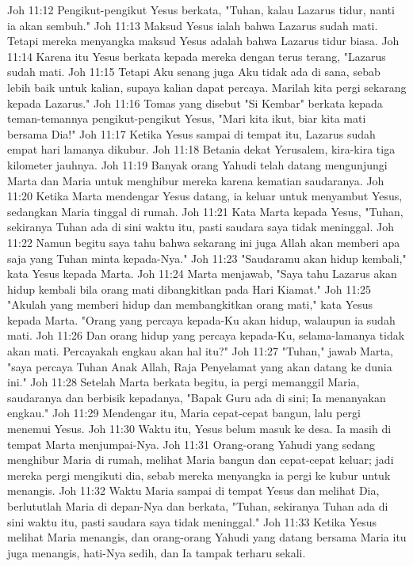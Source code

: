 Joh 11:12  Pengikut-pengikut Yesus berkata, "Tuhan, kalau Lazarus tidur, nanti ia akan sembuh."
Joh 11:13  Maksud Yesus ialah bahwa Lazarus sudah mati. Tetapi mereka menyangka maksud Yesus adalah bahwa Lazarus tidur biasa.
Joh 11:14  Karena itu Yesus berkata kepada mereka dengan terus terang, "Lazarus sudah mati.
Joh 11:15  Tetapi Aku senang juga Aku tidak ada di sana, sebab lebih baik untuk kalian, supaya kalian dapat percaya. Marilah kita pergi sekarang kepada Lazarus."
Joh 11:16  Tomas yang disebut "Si Kembar" berkata kepada teman-temannya pengikut-pengikut Yesus, "Mari kita ikut, biar kita mati bersama Dia!"
Joh 11:17  Ketika Yesus sampai di tempat itu, Lazarus sudah empat hari lamanya dikubur.
Joh 11:18  Betania dekat Yerusalem, kira-kira tiga kilometer jauhnya.
Joh 11:19  Banyak orang Yahudi telah datang mengunjungi Marta dan Maria untuk menghibur mereka karena kematian saudaranya.
Joh 11:20  Ketika Marta mendengar Yesus datang, ia keluar untuk menyambut Yesus, sedangkan Maria tinggal di rumah.
Joh 11:21  Kata Marta kepada Yesus, "Tuhan, sekiranya Tuhan ada di sini waktu itu, pasti saudara saya tidak meninggal.
Joh 11:22  Namun begitu saya tahu bahwa sekarang ini juga Allah akan memberi apa saja yang Tuhan minta kepada-Nya."
Joh 11:23  "Saudaramu akan hidup kembali," kata Yesus kepada Marta.
Joh 11:24  Marta menjawab, "Saya tahu Lazarus akan hidup kembali bila orang mati dibangkitkan pada Hari Kiamat."
Joh 11:25  "Akulah yang memberi hidup dan membangkitkan orang mati," kata Yesus kepada Marta. "Orang yang percaya kepada-Ku akan hidup, walaupun ia sudah mati.
Joh 11:26  Dan orang hidup yang percaya kepada-Ku, selama-lamanya tidak akan mati. Percayakah engkau akan hal itu?"
Joh 11:27  "Tuhan," jawab Marta, "saya percaya Tuhan Anak Allah, Raja Penyelamat yang akan datang ke dunia ini."
Joh 11:28  Setelah Marta berkata begitu, ia pergi memanggil Maria, saudaranya dan berbisik kepadanya, "Bapak Guru ada di sini; Ia menanyakan engkau."
Joh 11:29  Mendengar itu, Maria cepat-cepat bangun, lalu pergi menemui Yesus.
Joh 11:30  Waktu itu, Yesus belum masuk ke desa. Ia masih di tempat Marta menjumpai-Nya.
Joh 11:31  Orang-orang Yahudi yang sedang menghibur Maria di rumah, melihat Maria bangun dan cepat-cepat keluar; jadi mereka pergi mengikuti dia, sebab mereka menyangka ia pergi ke kubur untuk menangis.
Joh 11:32  Waktu Maria sampai di tempat Yesus dan melihat Dia, berlututlah Maria di depan-Nya dan berkata, "Tuhan, sekiranya Tuhan ada di sini waktu itu, pasti saudara saya tidak meninggal."
Joh 11:33  Ketika Yesus melihat Maria menangis, dan orang-orang Yahudi yang datang bersama Maria itu juga menangis, hati-Nya sedih, dan Ia tampak terharu sekali.
